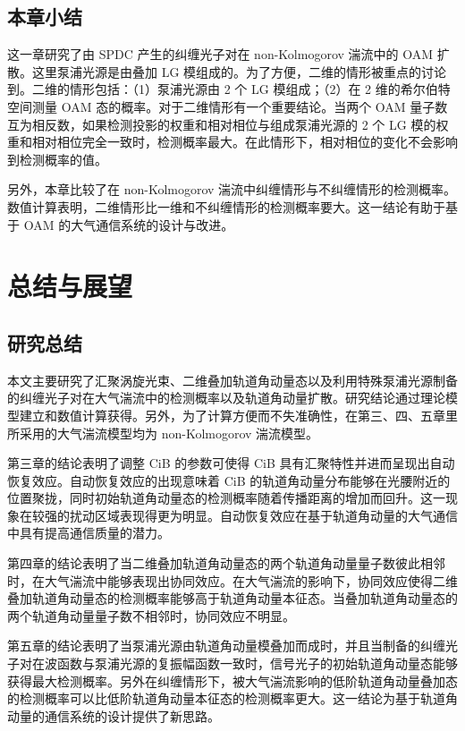 \documentclass[master]{thesis-uestc}
\begin{document}
\section{本章小结}
这一章研究了由 SPDC 产生的纠缠光子对在 non-Kolmogorov 湍流中的 OAM 扩散。这里泵浦光源是由叠加 LG 模组成的。为了方便，二维的情形被重点的讨论到。二维的情形包括：（1）泵浦光源由 2 个 LG 模组成；（2）在 2 维的希尔伯特空间测量 OAM 态的概率。对于二维情形有一个重要结论。当两个 OAM 量子数互为相反数，如果检测投影的权重和相对相位与组成泵浦光源的 2 个 LG 模的权重和相对相位完全一致时，检测概率最大。在此情形下，相对相位的变化不会影响到检测概率的值。

另外，本章比较了在 non-Kolmogorov 湍流中纠缠情形与不纠缠情形的检测概率。数值计算表明，二维情形比一维和不纠缠情形的检测概率要大。这一结论有助于基于 OAM 的大气通信系统的设计与改进。


\chapter{总结与展望}
\section{研究总结}
本文主要研究了汇聚涡旋光束、二维叠加轨道角动量态以及利用特殊泵浦光源制备的纠缠光子对在大气湍流中的检测概率以及轨道角动量扩散。研究结论通过理论模型建立和数值计算获得。另外，为了计算方便而不失准确性，在第三、四、五章里所采用的大气湍流模型均为 non-Kolmogorov 湍流模型。

第三章的结论表明了调整 CiB 的参数可使得 CiB 具有汇聚特性并进而呈现出自动恢复效应。自动恢复效应的出现意味着 CiB 的轨道角动量分布能够在光腰附近的位置聚拢，同时初始轨道角动量态的检测概率随着传播距离的增加而回升。这一现象在较强的扰动区域表现得更为明显。自动恢复效应在基于轨道角动量的大气通信中具有提高通信质量的潜力。

第四章的结论表明了当二维叠加轨道角动量态的两个轨道角动量量子数彼此相邻时，在大气湍流中能够表现出协同效应。在大气湍流的影响下，协同效应使得二维叠加轨道角动量态的检测概率能够高于轨道角动量本征态。当叠加轨道角动量态的两个轨道角动量量子数不相邻时，协同效应不明显。

第五章的结论表明了当泵浦光源由轨道角动量模叠加而成时，并且当制备的纠缠光子对在波函数与泵浦光源的复振幅函数一致时，信号光子的初始轨道角动量态能够获得最大检测概率。另外在纠缠情形下，被大气湍流影响的低阶轨道角动量叠加态的检测概率可以比低阶轨道角动量本征态的检测概率更大。这一结论为基于轨道角动量的通信系统的设计提供了新思路。
\end{document}
